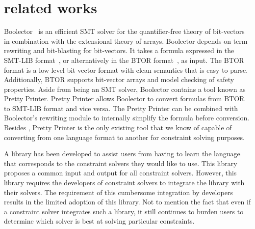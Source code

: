 \section{related works}
\label{sec:related}

Boolector~\cite{boolector2009} is an efficient SMT solver for the quantifier-free theory
of bit-vectors in combination with the extensional theory of arrays.
Boolector depends on term rewriting and bit-blasting for bit-vectors. It
takes a formula expressed in the SMT-LIB format~\cite{smtlib2015}, or alternatively in
the BTOR format~\cite{btor2008}, as input.
The BTOR format is a low-level bit-vector format with clean semantics that is easy to
parse. Additionally, BTOR supports bit-vector arrays and model checking of safety
properties.
Aside from being an SMT solver, Boolector contains a tool known as
Pretty Printer. Pretty Printer allows Boolector to convert formulas from BTOR to
SMT-LIB format and vice versa. The Pretty Printer can be combined with Boolector’s
rewriting module to internally simplify the formula before conversion.
Besides \imss, Pretty Printer is the only existing tool that we know of capable of
converting from one language format to another for constraint solving purposes.

A library has been developed to assist users from having to learn the language that
corresponds to the constraint solvers they would like to use.
This library proposes a common input and output for all constraint solvers.
However, this library requires the
developers of constraint solvers to integrate the library with their solvers.
The requirement of this cumbersome integration by developers results in
the limited adoption of this library. Not to mention the fact that even if a
constraint solver integrates such a library, it still continues to burden users to
determine which solver is best at solving particular constraints.